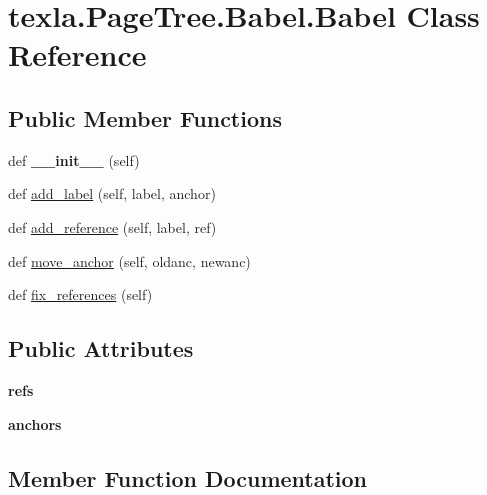 \hypertarget{classtexla_1_1PageTree_1_1Babel_1_1Babel}{}\section{texla.\+Page\+Tree.\+Babel.\+Babel Class Reference}
\label{classtexla_1_1PageTree_1_1Babel_1_1Babel}
\subsection*{Public Member Functions}
\begin{DoxyCompactItemize}
\item 
\hypertarget{classtexla_1_1PageTree_1_1Babel_1_1Babel_a4c6cf7487957f67b98f1a7d6520e86ba}{}\label{classtexla_1_1PageTree_1_1Babel_1_1Babel_a4c6cf7487957f67b98f1a7d6520e86ba} 
def {\bfseries \+\_\+\+\_\+init\+\_\+\+\_\+} (self)
\item 
def \hyperlink{classtexla_1_1PageTree_1_1Babel_1_1Babel_a60491a66c7f0bbd27cbcdb10447e2902}{add\+\_\+label} (self, label, anchor)
\item 
def \hyperlink{classtexla_1_1PageTree_1_1Babel_1_1Babel_a9fa3d1d8628ea14de175e506640bc160}{add\+\_\+reference} (self, label, ref)
\item 
def \hyperlink{classtexla_1_1PageTree_1_1Babel_1_1Babel_a0c75743fd9b66c057b5a27900ccb8e32}{move\+\_\+anchor} (self, oldanc, newanc)
\item 
def \hyperlink{classtexla_1_1PageTree_1_1Babel_1_1Babel_a1d4846dd94d6c4c272303703b7438f9e}{fix\+\_\+references} (self)
\end{DoxyCompactItemize}
\subsection*{Public Attributes}
\begin{DoxyCompactItemize}
\item 
\hypertarget{classtexla_1_1PageTree_1_1Babel_1_1Babel_aad0f2a6c8574722a11a5ce0a7dee78bd}{}\label{classtexla_1_1PageTree_1_1Babel_1_1Babel_aad0f2a6c8574722a11a5ce0a7dee78bd} 
{\bfseries refs}
\item 
\hypertarget{classtexla_1_1PageTree_1_1Babel_1_1Babel_ad817351db8cee0a76bf2ef622bb02152}{}\label{classtexla_1_1PageTree_1_1Babel_1_1Babel_ad817351db8cee0a76bf2ef622bb02152} 
{\bfseries anchors}
\end{DoxyCompactItemize}


\subsection{Member Function Documentation}
\hypertarget{classtexla_1_1PageTree_1_1Babel_1_1Babel_a60491a66c7f0bbd27cbcdb10447e2902}{}\label{classtexla_1_1PageTree_1_1Babel_1_1Babel_a60491a66c7f0bbd27cbcdb10447e2902} 
